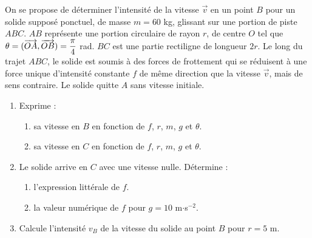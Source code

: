 \documentclass[11pt]{article}
\begin{document}
On se propose de déterminer l'intensité de la vitesse $\vec{v}$ en un point $B$ pour un solide supposé ponctuel, de masse $m = 60$ kg, glissant sur une portion de piste $ABC$. $AB$ représente une portion circulaire de rayon $r$, de centre $O$ tel que $\theta = (\overrightarrow{OA}, \overrightarrow{OB}) = \dfrac{\pi}{4}$ rad. $BC$ est une partie rectiligne de longueur $2r$. Le long du trajet $ABC$, le solide est soumis à des forces de frottement qui se réduisent à une force unique d'intensité constante $f$ de même direction que la vitesse $\vec{v}$, mais de sens contraire. Le solide quitte $A$ sans vitesse initiale.

\begin{center}
\end{center}

\begin{enumerate}
  \item Exprime :
  \begin{enumerate}[label=\alph*.]
    \item sa vitesse en $B$ en fonction de $f$, $r$, $m$, $g$ et $\theta$.
    \item sa vitesse en $C$ en fonction de $f$, $r$, $m$, $g$ et $\theta$.
  \end{enumerate}
  \item Le solide arrive en $C$ avec une vitesse nulle. Détermine :
  \begin{enumerate}[label=\alph*.]
    \item l'expression littérale de $f$.
    \item la valeur numérique de $f$ pour $g = 10$ m$\cdot$s$^{-2}$.
  \end{enumerate}
  \item Calcule l'intensité $v_B$ de la vitesse du solide au point $B$ pour $r = 5$ m.
\end{enumerate}
\end{document}
